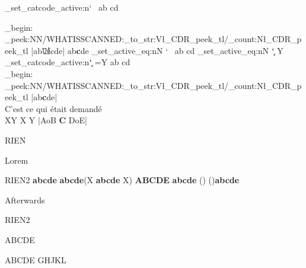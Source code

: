 \ExplSyntaxOn
\def\TEST{
  \group_begin:
  \CDRCode_peek:NN\DIDSCAN
}
\def\DIDSCAN{/WHAT\space IS\space SCANNED:\tl_to_str:V\l_CDR_peek_tl/\tl_count:N\l_CDR_peek_tl}
\ExplSyntaxOff
\makeatother
%
\bgroup
\ExplSyntaxOn
\char_set_catcode_active:n{`\ }
\ExplSyntaxOff
ab cd
\egroup
\TEST|ab㍤cde|
ab\textbf{c}de
\ExplSyntaxOn
\char_set_active_eq:nN { `\  } \FOO
\ExplSyntaxOff
\def\FOO{Y}
ab cd
\bgroup
\ExplSyntaxOn
\def\FOO{Y}
\char_set_active_eq:nN { `\c  } \FOO
\char_set_catcode_active:n{`\c }
=\FOO
\ExplSyntaxOff
ab cd
\egroup
\ttfamily\\
\TEST|ab\textbf    {c}de|\\
C'est ce qui était demandé\\
\newpage
XY
X%
%
Y%
\typeout{========}%
|AoB \textbf{C} DoE|

\CDRDebugOn
\begin{CDRBlock}
RIEN
\end{CDRBlock}
Lorem
\begin{CDRBlock} [
  pygments=false,
  show spaces,
  tab size=3,
  escape inside=(),
]%
RIEN2
\textbf{abcde}
    \textbf{abcde}(X \textbf{abcde} X)  \textbf{ABCDE}
	\textbf{abcde}
	(\bgroup\color{red})	(\egroup)\textbf{abcde}
\end{CDRBlock}
\lipsum[3]
Afterwards
\typeout{-------------------}
\begin{CDRBlock}
RIEN2
\def\foo#1{
  \textbf{#1}
}
\end{CDRBlock}
ABCDE
\trivlist\item ABCDE
\endtrivlist
GHJKL
\endinput

\ExplSyntaxOff
\makeatother


